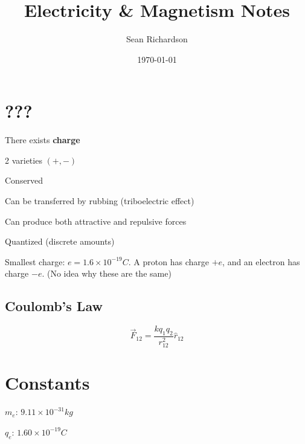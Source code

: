 \documentclass[11pt]{article}
\begin{document}
	\title{Electricity \& Magnetism Notes}
	\author{Sean Richardson}
	\date{\today}
	\maketitle
	
	\raggedright
	
	\section{???}
		There exists \textbf{charge}
		\begin{myitems}
			\item 2 varieties $(+,-)$
			\item Conserved
			\item Can be transferred by rubbing (triboelectric effect)
			\item Can produce both attractive and repulsive forces
			\item Quantized (discrete amounts)
			\begin{myitems}
				\item Smallest charge: $e=1.6\times 10^{-19} C$. A proton has charge $+e$, and an electron has charge $-e$. (No idea why these are the same)
			\end{myitems}
		\end{myitems}
		\subsection{Coulomb's Law}
			\begin{equation}
				\vec{F}_{12} = \frac{k q_1 q_2}{r_{12}^2}\hat{r}_{12}
			\end{equation}
			\section{Constants}
				\begin{mydes}
					\item{$m_e$:} $9.11 \times 10^{-31} kg$
					\item{$q_e$:} $1.60 \times 10^{-19} C$
				\end{mydes}
\end{document}
